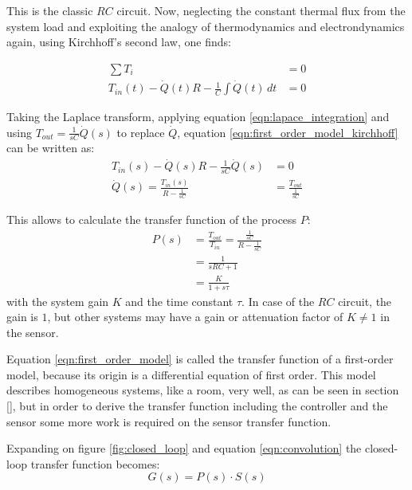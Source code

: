 \begin{figure}[h]
    \centering
\end{figure}

This is the classic $RC$ circuit. Now, neglecting the constant thermal flux from the system load and exploiting the analogy of thermodynamics and electrondynamics again, using Kirchhoff's second law, one finds:

\begin{align}
    \sum T_i &= 0 \nonumber\\
    T_{in}(t) - \dot{Q}(t) R - \frac 1 C \int \dot{Q}(t)\,dt &= 0 \label{eqn:first_order_model_kirchhoff}
\end{align}

Taking the Laplace transform, applying equation \ref{eqn:lapace_integration} and using $T_{out} = \frac{1}{sC} \dot Q(s)$ to replace $\dot Q$, equation \ref{eqn:first_order_model_kirchhoff} can be written as:
\begin{align*}
    T_{in}(s) - \dot{Q}(s) R - \frac{1}{sC} \dot{Q}(s) &= 0\\
    \dot{Q}(s) = \frac{T_{in}(s)}{R-\frac{1}{sC}} &= \frac{T_{out}}{\frac{1}{sC}}
\end{align*}

This allows to calculate the transfer function of the process $P$:
\begin{align}
    P(s) &= \frac{T_{out}}{T_{in}} = \frac{\frac{1}{sC}}{R-\frac{1}{sC}} \nonumber\\
    &= \frac{1}{sRC + 1} \nonumber\\
    &= \frac{K}{1 + s\tau} \label{eqn:first_order_model}
\end{align}
with the system gain $K$ and the time constant $\tau$. In case of the $RC$ circuit, the gain is $1$, but other systems may have a gain or attenuation factor of $K \neq 1$ in the sensor.

Equation \ref{eqn:first_order_model} is called the transfer function of a first-order model, because its origin is a differential equation of first order. This model describes homogeneous systems, like a room, very well, as can be seen in section \ref{}, but in order to derive the transfer function including the controller and the sensor some more work is required on the sensor transfer function.

Expanding on figure \ref{fig:closed_loop} and equation \ref{eqn:convolution} the closed-loop transfer function becomes:
\begin{equation}
    G(s) = P(s) \cdot S(s)
\end{equation}


